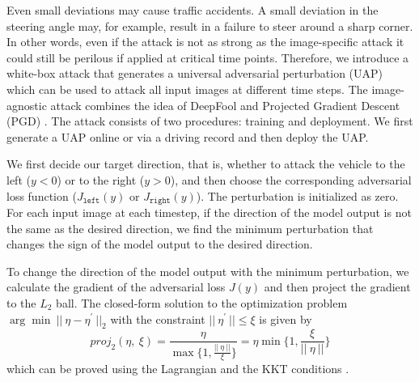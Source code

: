 Even small deviations may cause traffic accidents. A small deviation in the steering angle may, for example, result in a failure to steer around a sharp corner. In other words, even if the attack is not as strong as the image-specific attack it could still be perilous if applied at critical time points. Therefore, we introduce a white-box attack that generates a universal adversarial perturbation (UAP) \citep{moosavi2017universal} which can be used to attack all input images at different time steps. The image-agnostic attack combines the idea of DeepFool \citep{moosavi2016deepfool} and Projected Gradient Descent (PGD) \citep{madry2017towards}. The attack consists of two procedures: training and deployment. We first generate a UAP online or via a driving record and then deploy the UAP.

We first decide our target direction, that is, whether to attack the vehicle to the left ($y < 0$) or to the right ($y > 0$), and then choose the corresponding adversarial loss function ($J_{\texttt{left}}(y)$ or $J_{\texttt{right}}(y)$). The perturbation is initialized as zero. For each input image at each timestep, if the direction of the model output is not the same as the desired direction, we find the minimum perturbation that changes the sign of the model output to the desired direction. 

To change the direction of the model output with the minimum perturbation, we calculate the gradient of the adversarial loss $J(y)$ and then project the gradient to the $L_2$ ball. The closed-form solution to the optimization problem $\arg \min \ ||\ \eta - \eta^{'} \ ||_{2}$ with the constraint $||\ \eta^{'} \ || \leq \xi$ is given by
\begin{equation}
    proj_{2}(\eta,\  \xi) = \frac{\eta}{\max\{1, \frac{||\ \eta\ ||}{\xi}\}} =  \eta \min\{1, \frac{\xi}{||\ \eta\ ||} \}
\end{equation}
which can be proved using the Lagrangian and the KKT conditions \citep{boyd2004convex}.



